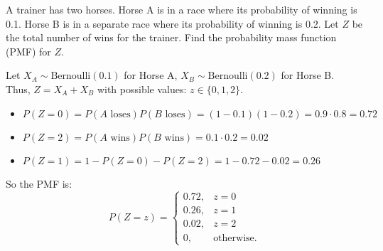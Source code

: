 \documentclass[a4paper, 10pt]{article}
\begin{document}
\begin{tosubmit}
\problem[12]
A trainer has two horses. Horse A is in a race where its probability of winning is 0.1.
Horse B is in a separate race where its probability of winning is 0.2.
Let \( Z \) be the total number of wins for the trainer.
Find the probability mass function (PMF) for \( Z \).

\vspace{0.5em}
\par\noindent\submitsolution
Let \( X_A\sim \text{Bernoulli}(0.1) \) for Horse A, \( X_B\sim \text{Bernoulli}(0.2) \) for Horse B. \\
Thus, \( Z=X_A+X_B \) with possible values: \( z\in\{0, 1, 2\} \).

\begin{itemize}
    \item \( P(Z=0)=P(A\text{ loses})P(B\text{ loses})=(1-0.1)(1-0.2)=0.9\cdot0.8=0.72 \)
    \item \( P(Z=2)=P(A\text{ wins})P(B\text{ wins})=0.1\cdot0.2=0.02 \)
    \item \( P(Z=1)=1-P(Z=0)-P(Z=2)=1-0.72-0.02=0.26 \)
\end{itemize}

So the PMF is:
\[\boxed{
    P(Z = z) =
    \begin{cases}
    0.72, & z=0\\
    0.26, & z=1\\
    0.02, & z=2\\
    0, & \text{otherwise.}
    \end{cases}
}\]
\end{tosubmit}
\end{document}
